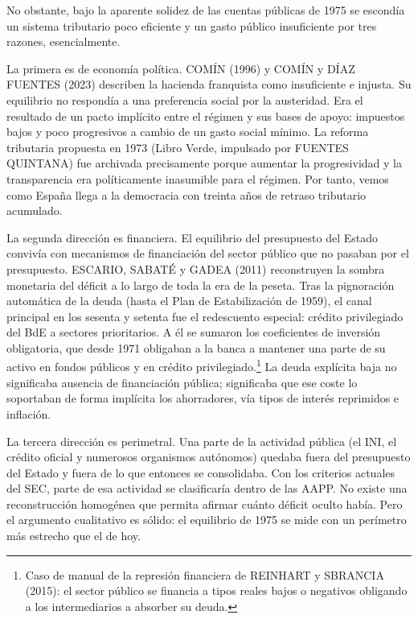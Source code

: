 \documentclass[10pt,a4paper]{article}
\begin{document}
No obstante, bajo la aparente solidez de las cuentas públicas de 1975 se escondía un sistema tributario poco eficiente y un gasto público insuficiente por tres razones, esencialmente.

La primera es de economía política. COMÍN (1996) y COMÍN y DÍAZ FUENTES (2023) describen la hacienda franquista como insuficiente e injusta. Su equilibrio no respondía a una preferencia social por la austeridad. Era el resultado de un pacto implícito entre el régimen y sus bases de apoyo: impuestos bajos y poco progresivos a cambio de un gasto social mínimo. La reforma tributaria propuesta en 1973 (Libro Verde, impulsado por FUENTES QUINTANA) fue archivada precisamente porque aumentar la progresividad y la transparencia era políticamente inasumible para el régimen. Por tanto, vemos como España llega a la democracia con treinta años de retraso tributario acumulado.

La segunda dirección es financiera. El equilibrio del presupuesto del Estado convivía con mecanismos de financiación del sector público que no pasaban por el presupuesto. ESCARIO, SABATÉ y GADEA (2011) reconstruyen la sombra monetaria del déficit a lo largo de toda la era de la peseta. Tras la pignoración automática de la deuda (hasta el Plan de Estabilización de 1959), el canal principal en los sesenta y setenta fue el redescuento especial: crédito privilegiado del BdE a sectores prioritarios. A él se sumaron los coeficientes de inversión obligatoria, que desde 1971 obligaban a la banca a mantener una parte de su activo en fondos públicos y en crédito privilegiado.\footnote{%
    Caso de manual de la represión financiera de REINHART y SBRANCIA (2015): el sector público se financia a tipos reales bajos o negativos obligando a los intermediarios a absorber su deuda.
} La deuda explícita baja no significaba ausencia de financiación pública; significaba que ese coste lo soportaban de forma implícita los ahorradores, vía tipos de interés reprimidos e inflación.

La tercera dirección es perimetral. Una parte de la actividad pública (el INI, el crédito oficial y numerosos organismos autónomos) quedaba fuera del presupuesto del Estado y fuera de lo que entonces se consolidaba. Con los criterios actuales del SEC, parte de esa actividad se clasificaría dentro de las AAPP. No existe una reconstrucción homogénea que permita afirmar cuánto déficit oculto había. Pero el argumento cualitativo es sólido: el equilibrio de 1975 se mide con un perímetro más estrecho que el de hoy.
\end{document}
